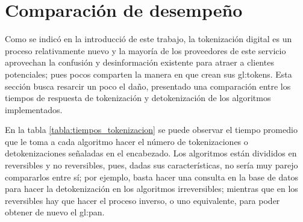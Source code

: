 %
%
%

\section{Comparación de desempeño}
\label{sec:comparacion}

Como se indicó en la introducció de este trabajo, la tokenización digital es un
proceso relativamente nuevo y la mayoría de los proveedores de este servicio
aprovechan la confusión y desinformación existente para atraer a clientes
potenciales; pues pocos comparten la manera en que crean sus \glspl{gl:token}.
Esta sección busca resarcir un poco el daño, presentado una comparación entre
los tiempos de respuesta de tokenización y detokenización de los algoritmos
implementados.

En la tabla \ref{tabla:tiempos_tokenizacion} se puede observar el tiempo
promedio que le toma a cada algoritmo hacer el número de tokenizaciones o
detokenizaciones señaladas en el encabezado. Los algoritmos están
divididos en reversibles y no reversibles, pues, dadas sus características, no
sería muy parejo compararlos entre sí; por ejemplo, basta hacer una consulta
en la base de datos para hacer la detokenización en los algoritmos
irreversibles; mientras que en los reversibles hay que hacer el proceso inverso,
o uno equivalente, para poder obtener de nuevo el \gls{gl:pan}.

